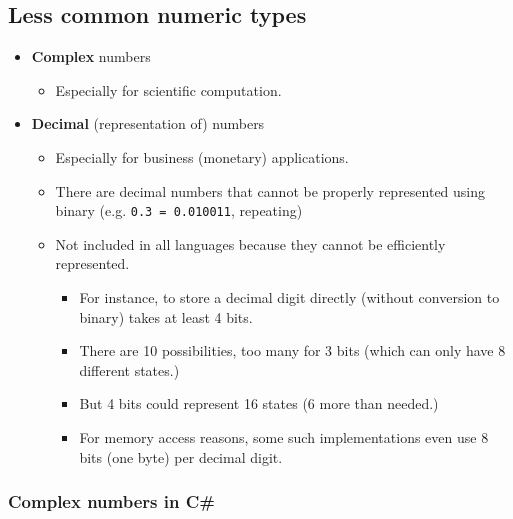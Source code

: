 \documentclass[11pt]{article}
\theoremstyle{definition}
\begin{document}
\subsection{Less common numeric types}
\label{sec:orgdc13bbe}

\begin{itemize}
\item \textbf{Complex} numbers
\begin{itemize}
\item Especially for scientific computation.
\end{itemize}
\item \textbf{Decimal} (representation of) numbers
\begin{itemize}
\item Especially for business (monetary) applications.
\item There are decimal numbers that cannot be properly represented
using binary (e.g. \texttt{0.3 = 0.010011}, repeating)
\item Not included in all languages because
they cannot be efficiently represented.
\begin{itemize}
\item For instance, to store a decimal digit directly
(without conversion to binary) takes at least 4 bits.
\item There are 10 possibilities, too many for 3 bits (which can
only have 8 different states.)
\item But 4 bits could represent 16 states (6 more than needed.)
\item For memory access reasons, some such implementations
even use 8 bits (one byte) per decimal digit.
\end{itemize}
\end{itemize}
\end{itemize}

\subsubsection{Complex numbers in C\#}
\label{sec:org7e7d963}
\end{document}
